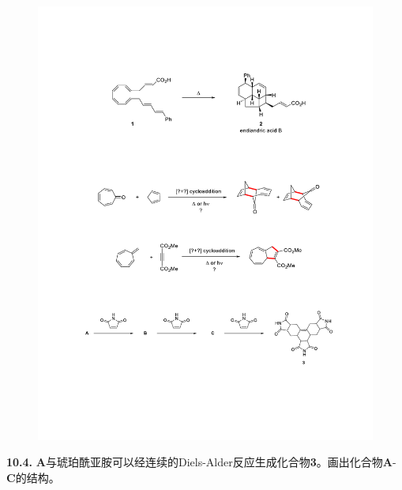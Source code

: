 \begin{figure}[h]
	\centering
	\includegraphics[width=12cm]{./pic/t10-4.pdf}
\end{figure}

\noindent\textbf{10.4.}
\textbf{A}与琥珀酰亚胺可以经连续的Diels-Alder反应生成化合物\textbf{3}。画出化合物\textbf{A}-\textbf{C}的结构。

